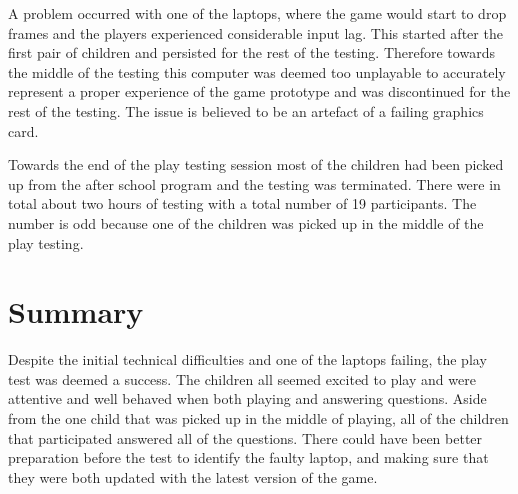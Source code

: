 
A problem occurred with one of the laptops, where the game would start to drop frames and the players experienced considerable input lag. This started after the first pair of children and persisted for the rest of the testing. Therefore towards the middle of the testing this computer was deemed too unplayable to accurately represent a proper experience of the game prototype and was discontinued for the rest of the testing. The issue is believed to be an artefact of a failing graphics card.

Towards the end of the play testing session most of the children had been picked up from the after school program and the testing was terminated. There were in total about two hours of testing with a total number of 19 participants. The number is odd because one of the children was picked up in the middle of the play testing.


\section{Summary}
Despite the initial technical difficulties and one of the laptops failing, the play test was deemed a success. The children all seemed excited to play and were attentive and well behaved when both playing and answering questions. Aside from the one child that was picked up in the middle of playing, all of the children that participated answered all of the questions. There could have been better preparation before the test to identify the faulty laptop, and making sure that they were both updated with the latest version of the game.